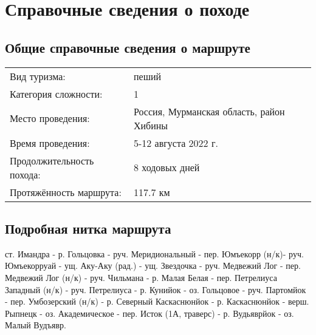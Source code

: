 \newpage
\section{Справочные сведения о походе}
\subsection{Общие справочные сведения о маршруте}
\begin{tabular}{ l l }
    Вид туризма: & пеший\\
    Категория сложности: & 1\\
    Место проведения: & Россия, Мурманская область, район Хибины\\
    Время проведения: & 5-12 августа 2022 г.\\
    Продолжительность похода: & 8 ходовых дней\\
    Протяжённость маршрута: & 117.7 км\\
\end{tabular}

\subsection{Подробная нитка маршрута}
ст. Имандра - р. Гольцовка - руч. Меридиональный - пер. Юмъекорр (н/к)- руч. Юмъекорруай -
ущ. Аку-Аку (рад.) - ущ. Звездочка - руч. Медвежий Лог - пер. Медвежий Лог (н/к) - руч. Чильмана -
р. Малая Белая - пер. Петрелиуса Западный (н/к) - руч. Петрелиуса - р. Кунийок - оз. Гольцовое -
руч. Партомйок - пер. Умбозерский (н/к) - р. Северный Каскаснюнйок - р. Каскаснюнйок - верш. Рыпнецк -
оз. Академическое - пер. Исток (1А, траверс) - р. Вудьяврйок - оз. Малый Вудъявр.

